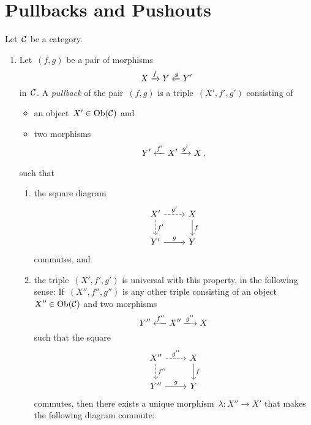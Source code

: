\section{Pullbacks and Pushouts}


\begin{definition*}
  Let~$\mathcal{C}$ be a category.
  \begin{enumerate}
    \item
      Let~$(f,g)$ be a pair of morphisms
      \[
        X \xrightarrow{f} Y \xleftarrow{g} Y'
      \]
      in~$\mathcal{C}$.
      A \emph{pullback} of the pair~$(f,g)$ is a triple~$(X', f', g')$ consisting of
      \begin{itemize}
        \item
          an object~$X' \in \operatorname{Ob}(\mathcal{C})$ and
        \item
          two morphisms \[Y' \xleftarrow{f'} X' \xrightarrow{g'} X \,,\]
      \end{itemize}
      such that
      \begin{enumerate}[label=(PB\arabic*)]
        \item
          the square diagram
          \[
            \begin{tikzcd}
                X'
                \arrow[dashed]{r}[above]{g'}
                \arrow[dashed]{d}[right]{f'}
              & X
                \arrow{d}[right]{f}
              \\
                Y'
                \arrow{r}[above]{g}
              & Y
            \end{tikzcd}
          \]
          commutes, and
        \item
          the triple~$(X', f', g')$ is universal with this property, in the following sense:
          If~$(X'', f'', g'')$ is any other triple consisting of an object~$X'' \in \operatorname{Ob}(\mathcal{C})$ and two morphisms
          \[
            Y'' \xlongfrom{f''} X'' \xlongto{g''} X
          \]
          such that the square
          \[
            \begin{tikzcd}
                X''
                \arrow[dashed]{r}[above]{g''}
                \arrow[dashed]{d}[right]{f''}
              & X
                \arrow{d}[right]{f}
              \\
                Y''
                \arrow{r}[above]{g}
              & Y
            \end{tikzcd}
          \]
          commutes, then there exists a unique morphism~$\lambda \colon X'' \to X'$ that makes the following diagram commute:
          \[
\]
\end{enumerate}
\end{enumerate}
\end{definition*}
